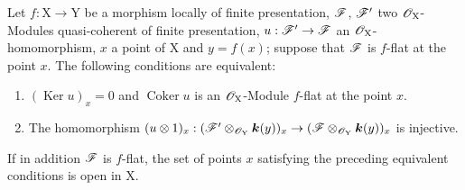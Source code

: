 \begin{proposition}[11.3.7]
\label{IV.11.3.7}
Let $f:\mathrm{X}\to\mathrm{Y}$ be a morphism locally of finite presentation, $\mathscr{F}$, $\mathscr{F}'$ two $\mathscr{O}_\mathrm{X}$-Modules quasi-coherent of finite presentation, $u:\mathscr{F}'\to\mathscr{F}$ an $\mathscr{O}_\mathrm{X}$-homomorphism, $x$ a point of $\mathrm{X}$ and $y=f(x)$; suppose that $\mathscr{F}$ is $f$-flat at the point $x$. The following conditions are equivalent:
\begin{enumerate}[label=\emph{\alph*)}]
  \item $(\operatorname{Ker} u)_x=0$ and $\operatorname{Coker} u$ is an $\mathscr{O}_\mathrm{X}$-Module $f$-flat at the point $x$.
  \item The homomorphism $(u\otimes 1)_x:(\mathscr{F}'\otimes_{\mathscr{O}_\mathrm{Y}}\boldsymbol{k}(y))_x\to(\mathscr{F}\otimes_{\mathscr{O}_\mathrm{Y}}\boldsymbol{k}(y))_x$ is injective.
\end{enumerate}
If in addition $\mathscr{F}$ is $f$-flat, the set of points $x$ satisfying the preceding equivalent conditions is open in $\mathrm{X}$.
\end{proposition}

